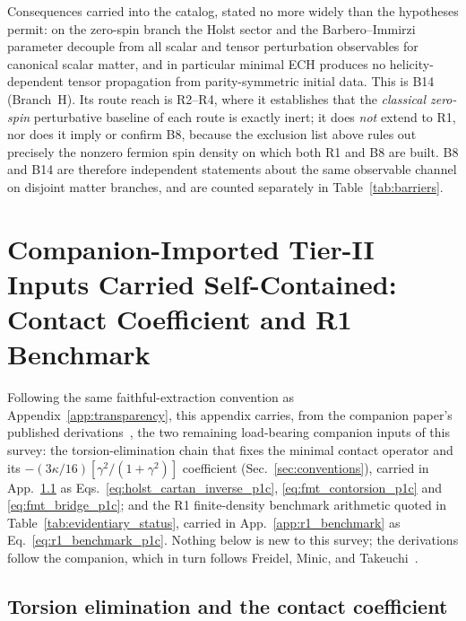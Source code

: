 \documentclass[aps,prd,twocolumn,superscriptaddress,showpacs,preprintnumbers,nofootinbib,longbibliography,floatfix]{revtex4-2}
\begin{document}
Consequences carried into the catalog, stated no more widely than the
hypotheses permit: on the zero-spin branch the Holst sector and the
Barbero--Immirzi parameter decouple from all scalar and tensor
perturbation observables for canonical scalar matter, and in particular
minimal ECH produces no helicity-dependent tensor propagation from
parity-symmetric initial data. This is B14 (Branch~H). Its route reach is
R2--R4, where it establishes that the \emph{classical zero-spin}
perturbative baseline of each route is exactly inert; it does \emph{not}
extend to R1, nor does it imply or confirm B8, because the exclusion list
above rules out precisely the nonzero fermion spin density on which both
R1 and B8 are built. B8 and B14 are therefore independent statements
about the same observable channel on disjoint matter branches, and are
counted separately in Table~\ref{tab:barriers}.

\section{Companion-Imported Tier-II Inputs Carried Self-Contained:
Contact Coefficient and R1 Benchmark}\label{app:companion_inputs}

Following the same faithful-extraction convention as
Appendix~\ref{app:transparency}, this appendix carries, from the
companion paper's published derivations~\cite{Golden2026P1a}, the two
remaining load-bearing companion inputs of this survey: the
torsion-elimination chain that fixes the minimal contact operator and
its $-(3\kappa/16)[\gamma^2/(1+\gamma^2)]$ coefficient
(Sec.~\ref{sec:conventions}), carried in
App.~\ref{app:contact_coeff} as
Eqs.~\eqref{eq:holst_cartan_inverse_p1c},
\eqref{eq:fmt_contorsion_p1c} and \eqref{eq:fmt_bridge_p1c}; and the R1
finite-density benchmark arithmetic quoted in
Table~\ref{tab:evidentiary_status}, carried in
App.~\ref{app:r1_benchmark} as Eq.~\eqref{eq:r1_benchmark_p1c}. Nothing below
is new to this survey; the derivations follow the companion, which in
turn follows Freidel, Minic, and Takeuchi~\cite{Freidel2005}.

\subsection{Torsion elimination and the contact
coefficient}\label{app:contact_coeff}
\end{document}

